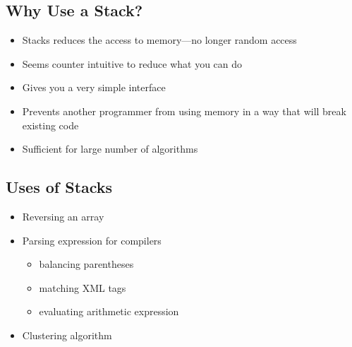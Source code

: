 \begin{slide}
\section{Why Use a Stack?}

\begin{PauseHighLight}
  \begin{itemize}
  \item Stacks reduces the access to memory---no longer random
    access\pause
  \item Seems counter intuitive to reduce what you can do\pause
  \item Gives you a very simple interface\pause
  \item Prevents another programmer from using memory in a way that will
    break existing code\pause
  \item Sufficient for large number of algorithms\pause
  \end{itemize}
\end{PauseHighLight}
\end{slide}


\begin{slide}
\section{Uses of Stacks}

\begin{PauseHighLight}
  \begin{itemize}
  \item Reversing an array\pause
  \item Parsing expression for compilers\pause
    \begin{itemize}
    \item balancing parentheses\pause
    \item matching XML tags\pause
    \item evaluating arithmetic expression\pause
    \end{itemize}
  \item Clustering algorithm\pause
\end{itemize}
\end{PauseHighLight}

\end{slide}


